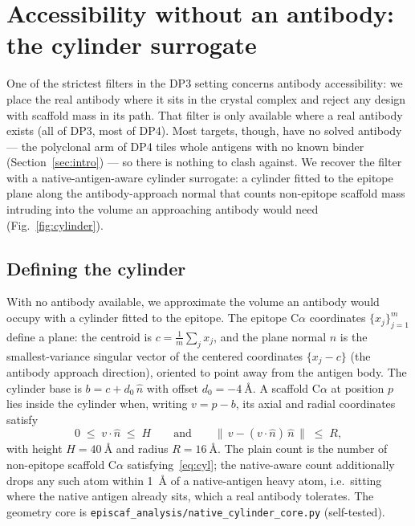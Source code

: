 \section{Accessibility without an antibody: the cylinder surrogate}\label{sec:noab}
One of the strictest filters in the DP3 setting concerns antibody accessibility: we place the
real antibody where it sits in the crystal complex and reject any design with scaffold mass in
its path. That filter is only available where a real antibody exists (all of DP3, most of DP4).
Most targets, though, have no solved antibody --- the polyclonal arm of DP4 tiles whole
antigens with no known binder (Section~\ref{sec:intro}) --- so there is nothing to clash
against. We recover the filter with a native-antigen-aware cylinder surrogate: a cylinder
fitted to the epitope plane along the antibody-approach normal that counts non-epitope scaffold
mass intruding into the volume an approaching antibody would need (Fig.~\ref{fig:cylinder}).

\subsection{Defining the cylinder}\label{sec:cyldef}
With no antibody available, we approximate the volume an antibody would occupy with a
cylinder fitted to the epitope. The epitope C$\alpha$ coordinates $\{x_j\}_{j=1}^{m}$ define
a plane: the centroid is $c=\tfrac{1}{m}\sum_j x_j$, and the plane normal $\hat n$ is the
smallest-variance singular vector of the centered coordinates $\{x_j-c\}$ (the antibody
approach direction), oriented to point away from the antigen body. The cylinder base is
$b = c + d_0\,\hat n$ with offset $d_0=\SI{-4}{\angstrom}$. A scaffold C$\alpha$ at position
$p$ lies inside the cylinder when, writing $v=p-b$, its axial and radial coordinates satisfy
\begin{equation}\label{eq:cyl}
0 \;\le\; v\cdot\hat n \;\le\; H
\qquad\text{and}\qquad
\bigl\lVert\, v-(v\cdot\hat n)\,\hat n \,\bigr\rVert \;\le\; R,
\end{equation}
with height $H=\SI{40}{\angstrom}$ and radius $R=\SI{16}{\angstrom}$. The plain count is the
number of non-epitope scaffold C$\alpha$ satisfying~\eqref{eq:cyl}; the native-aware count
additionally drops any such atom within \SI{1}{\angstrom} of a native-antigen heavy atom,
i.e.\ sitting where the native antigen already sits, which a real antibody tolerates. The
geometry core is \texttt{episcaf\_analysis/native\_cylinder\_core.py} (self-tested).

